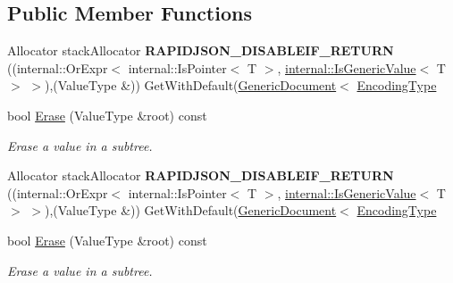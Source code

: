 \subsection*{Public Member Functions}
\begin{DoxyCompactItemize}
\item 
Allocator stack\+Allocator {\bfseries R\+A\+P\+I\+D\+J\+S\+O\+N\+\_\+\+D\+I\+S\+A\+B\+L\+E\+I\+F\+\_\+\+R\+E\+T\+U\+RN} ((internal\+::\+Or\+Expr$<$ internal\+::\+Is\+Pointer$<$ T $>$, \hyperlink{structinternal_1_1_is_generic_value}{internal\+::\+Is\+Generic\+Value}$<$ T $>$ $>$),(Value\+Type \&)) Get\+With\+Default(\hyperlink{class_generic_document}{Generic\+Document}$<$ \hyperlink{class_generic_pointer_a4b802da797a7a0b615fd9611cedb7c3b}{Encoding\+Type}\hypertarget{class_generic_pointer_aebf325c6fde06adfc4d959b507d7f170}{}\label{class_generic_pointer_aebf325c6fde06adfc4d959b507d7f170}

\item 
bool \hyperlink{class_generic_pointer_aa8fd4b1259fc500188f4162571b280ec}{Erase} (Value\+Type \&root) const 
\begin{DoxyCompactList}\small\item\em Erase a value in a subtree. \end{DoxyCompactList}\item 
Allocator stack\+Allocator {\bfseries R\+A\+P\+I\+D\+J\+S\+O\+N\+\_\+\+D\+I\+S\+A\+B\+L\+E\+I\+F\+\_\+\+R\+E\+T\+U\+RN} ((internal\+::\+Or\+Expr$<$ internal\+::\+Is\+Pointer$<$ T $>$, \hyperlink{structinternal_1_1_is_generic_value}{internal\+::\+Is\+Generic\+Value}$<$ T $>$ $>$),(Value\+Type \&)) Get\+With\+Default(\hyperlink{class_generic_document}{Generic\+Document}$<$ \hyperlink{class_generic_pointer_a4b802da797a7a0b615fd9611cedb7c3b}{Encoding\+Type}\hypertarget{class_generic_pointer_aebf325c6fde06adfc4d959b507d7f170}{}\label{class_generic_pointer_aebf325c6fde06adfc4d959b507d7f170}

\item 
bool \hyperlink{class_generic_pointer_aa8fd4b1259fc500188f4162571b280ec}{Erase} (Value\+Type \&root) const 
\begin{DoxyCompactList}\small\item\em Erase a value in a subtree. \end{DoxyCompactList}\end{DoxyCompactItemize}
